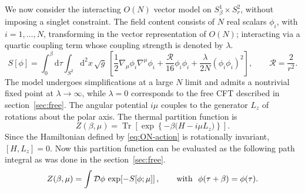 \documentclass[a4paper,11pt]{article}
\newcommand{\secref}[1]{section~\ref{#1}}
\newcommand{\dd}{\mathrm d}
\begin{document}
We now consider the interacting $O(N)$ vector model on
$S^1_\beta\times S^2_r$, without imposing a singlet constraint.  The field
content consists of $N$ real scalars $\phi_i$, with $i=1,\ldots,N$,
transforming in the vector representation of $O(N)$; interacting via a quartic coupling term whose coupling strength is denoted by $\lambda$.
\begin{equation}
 S[\phi]
 =\int_0^\beta\dd\tau\int_{S^2}\dd^2x\,\sqrt g\,
 \left[
 \frac12\nabla_\mu\phi_i\nabla^\mu\phi_i
 +\frac{\mathcal R}{16}\phi_i\phi_i
 +\frac{\lambda}{2N}(\phi_i\phi_i)^2
 \right],
 \qquad \mathcal R=\frac{2}{r^2}.
 \label{eq:ON-action}
\end{equation}
The model undergoes simplifications at a large $N$ limit and  admits a nontrivial fixed point at
$\lambda\to\infty$, while $\lambda=0$ corresponds to the free CFT described
in \secref{sec:free}.
The angular potential $i\mu$ couples to the generator $L_z$ of rotations about the
polar axis.  The thermal partition function is
\begin{equation}
 Z(\beta,\mu)
 =\operatorname{Tr}\!\left[
 \exp\!\left\{-\beta\bigl(H-i\mu L_z\bigr)\right\}
 \right].
 \label{eq:ON-trace}
\end{equation}
Since the Hamiltonian defined by \eqref{eq:ON-action} is rotationally
invariant, $[H,L_z]=0$. Now this partition function can be evaluated as the following path integral as was done in the  \secref{sec:free}.
\begin{equation}
 Z(\beta,\mu)
 =\int\mathcal D\phi\,\exp\!\left[-S[\phi;\mu]\right],
 \label{eq:ON-path-integral}\qquad {\rm with } \ \ \phi(\tau+\beta)=\phi(\tau).
\end{equation}
\end{document}
